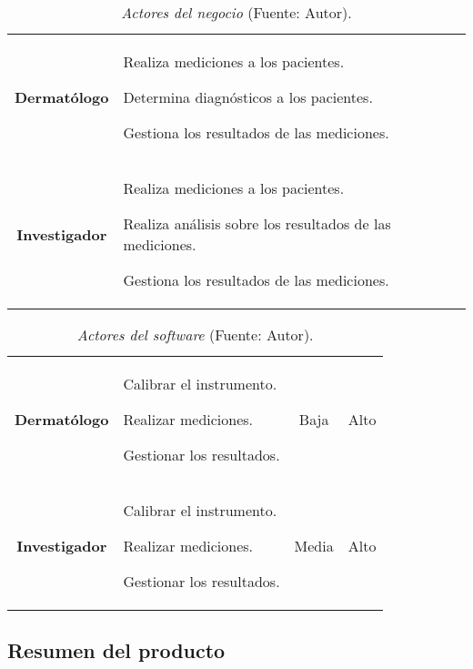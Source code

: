 		\begin{table}[h]
		\small
		\caption[Actores del negocio]{\textit{Actores del negocio} (Fuente: Autor).}
		\centering
		\setlength{\extrarowheight}{\altocelda}
		\begin{tabulary}{\anchotabla}{|c|J|}
			\hline
			 & \\ \hline
			\textbf{Dermat\'{o}logo} & 
			Realiza mediciones a los pacientes.
			
			Determina diagn\'{o}sticos a los pacientes.
			
			Gestiona los resultados de las mediciones.
		\\ \hline
			\textbf{Investigador} &
			Realiza mediciones a los pacientes.
			
			Realiza an\'{a}lisis sobre los resultados de las mediciones.
			
			Gestiona los resultados de las mediciones.\\ \hline
		\end{tabulary}
	\end{table}
	
			\begin{table}[h]
		\small
		\caption[Actores del software]{\textit{Actores del software} (Fuente: Autor).}
		\centering
		\setlength{\extrarowheight}{\altocelda}
		\begin{tabulary}{\anchotabla}{|c|L|c|c|}
			\hline
			 &  &  & \\ \hline
			\textbf{Dermat\'{o}logo} &
			Calibrar el instrumento.
			
			Realizar mediciones.
			
			Gestionar los resultados. &
			Baja &
			Alto\\ \hline
			
			\textbf{Investigador} &
			Calibrar el instrumento.
			
			Realizar mediciones.
			
			Gestionar los resultados. &
			Media &
			Alto\\ \hline
		\end{tabulary}
	\end{table}
	
	\subsection{Resumen del producto}
	

